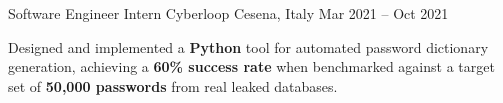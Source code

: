 \begin{cventries}
\cventry
{Software Engineer Intern} %
{Cyberloop} %
{Cesena, Italy} %
{Mar 2021 – Oct 2021} %
{
  \begin{cvitems}
    \item {Designed and implemented a \textbf{Python} tool for automated password dictionary generation, achieving a \textbf{60\% success rate} when benchmarked against a target set of \textbf{50,000 passwords} from real leaked databases.}
  \end{cvitems}
}

\end{cventries}
